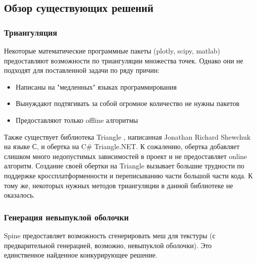 \documentclass{fefu}
\begin{document}
\subsection{Обзор существующих решений}
\subsubsection{Триангуляция}
Некоторые математические программные пакеты (plotly, scipy, matlab) предоставляют возможности по триангуляции 
множества точек. Однако они не подходят для поставленной задачи по ряду причин:
\begin{itemize}
    \item Написаны на "медленных" языках программирования
    \item Вынуждают подтягивать за собой огромное количество не нужны пакетов
    \item Предоставляют только offline алгоритмы
\end{itemize}
Также существует библиотека Triangle \cite{TriangleSite}, написанная Jonathan Richard Shewchuk на языке С, и
обертка на C\# Triangle.NET. К сожалению, обертка добавляет слишком много недопустимых зависимостей в проект и не 
предоставляет online алгоритм. Создание своей обертки на Triangle вызывает большие трудности по поддержке 
кроссплатформенности и переписыванию части большой части кода. К тому же, некоторых нужных методов триангуляции в 
данной библиотеке не оказалось.
\subsubsection{Генерация невыпуклой оболочки}
Spine предоставляет возможность сгенерировать меш для текстуры (с предварительной генерацией, возможно, невыпуклой оболочки). 
Это единственное найденное конкурирующее решение. 
\newpage


\end{document}
